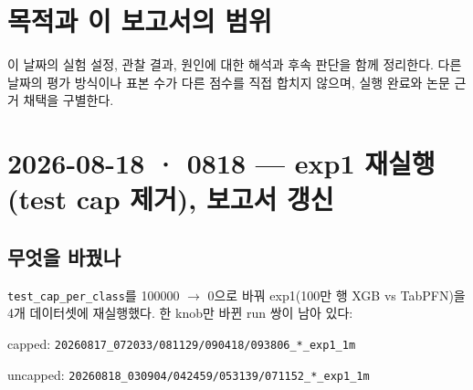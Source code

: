 




\section*{목적과 이 보고서의 범위}

이 날짜의 실험 설정, 관찰 결과, 원인에 대한 해석과 후속 판단을 함께 정리한다. 다른 날짜의 평가 방식이나 표본 수가 다른 점수를 직접 합치지 않으며, 실행 완료와 논문 근거 채택을 구별한다.


\section{2026-08-18 · 0818 — exp1 재실행 (test cap 제거), 보고서 갱신}
\label{report:20260818_0818}
\subsection{무엇을 바꿨나}
\texttt{test\_\allowbreak{}\allowbreak{}cap\allowbreak{}\_\allowbreak{}\allowbreak{}per\_\allowbreak{}\allowbreak{}cla\allowbreak{}ss}를 100000  \ensuremath{\rightarrow}  0으로 바꿔 exp1(100만 행 XGB vs TabPFN)을 4개 데이터셋에 재실행했다. 한 knob만 바뀐 run 쌍이 남아 있다:

\par\noindent \textbullet\enspace capped: \texttt{20260817\allowbreak{}\_\allowbreak{}\allowbreak{}072033/\allowbreak{}\allowbreak{}081129/\allowbreak{}\allowbreak{}0\allowbreak{}90418/\allowbreak{}\allowbreak{}09\allowbreak{}3806\_\allowbreak{}\allowbreak{}*\_\allowbreak{}\allowbreak{}e\allowbreak{}xp1\_\allowbreak{}\allowbreak{}1m}


\par\noindent \textbullet\enspace uncapped: \texttt{20260818\allowbreak{}\_\allowbreak{}\allowbreak{}030904/\allowbreak{}\allowbreak{}042459/\allowbreak{}\allowbreak{}0\allowbreak{}53139/\allowbreak{}\allowbreak{}07\allowbreak{}1152\_\allowbreak{}\allowbreak{}*\_\allowbreak{}\allowbreak{}e\allowbreak{}xp1\_\allowbreak{}\allowbreak{}1m}



